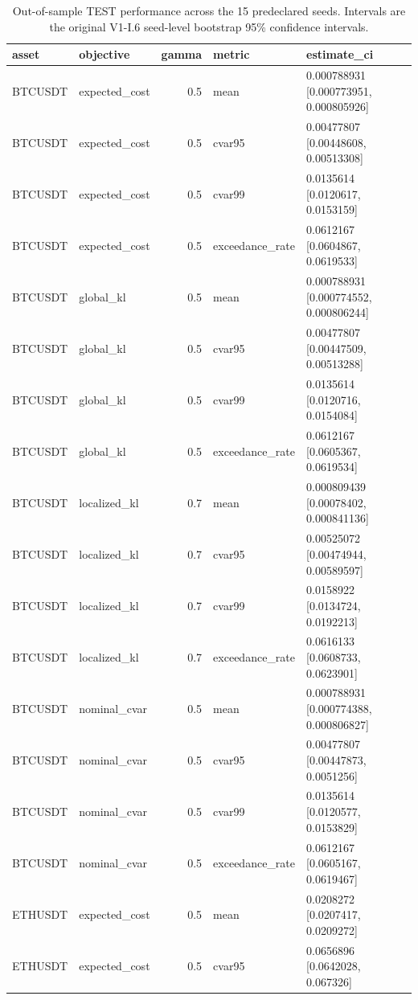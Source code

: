 \begin{table}[!htbp]
\centering
\caption{Out-of-sample TEST performance across the 15 predeclared seeds. Intervals are the original V1-I.6 seed-level bootstrap 95\% confidence intervals.}
\label{tab:i7_test_summary}
\small
\begin{tabular}{llrll}
\toprule
asset & objective & gamma & metric & estimate\_ci \\
\midrule
BTCUSDT & expected\_cost & 0.5 & mean & 0.000788931 [0.000773951, 0.000805926] \\
BTCUSDT & expected\_cost & 0.5 & cvar95 & 0.00477807 [0.00448608, 0.00513308] \\
BTCUSDT & expected\_cost & 0.5 & cvar99 & 0.0135614 [0.0120617, 0.0153159] \\
BTCUSDT & expected\_cost & 0.5 & exceedance\_rate & 0.0612167 [0.0604867, 0.0619533] \\
BTCUSDT & global\_kl & 0.5 & mean & 0.000788931 [0.000774552, 0.000806244] \\
BTCUSDT & global\_kl & 0.5 & cvar95 & 0.00477807 [0.00447509, 0.00513288] \\
BTCUSDT & global\_kl & 0.5 & cvar99 & 0.0135614 [0.0120716, 0.0154084] \\
BTCUSDT & global\_kl & 0.5 & exceedance\_rate & 0.0612167 [0.0605367, 0.0619534] \\
BTCUSDT & localized\_kl & 0.7 & mean & 0.000809439 [0.00078402, 0.000841136] \\
BTCUSDT & localized\_kl & 0.7 & cvar95 & 0.00525072 [0.00474944, 0.00589597] \\
BTCUSDT & localized\_kl & 0.7 & cvar99 & 0.0158922 [0.0134724, 0.0192213] \\
BTCUSDT & localized\_kl & 0.7 & exceedance\_rate & 0.0616133 [0.0608733, 0.0623901] \\
BTCUSDT & nominal\_cvar & 0.5 & mean & 0.000788931 [0.000774388, 0.000806827] \\
BTCUSDT & nominal\_cvar & 0.5 & cvar95 & 0.00477807 [0.00447873, 0.0051256] \\
BTCUSDT & nominal\_cvar & 0.5 & cvar99 & 0.0135614 [0.0120577, 0.0153829] \\
BTCUSDT & nominal\_cvar & 0.5 & exceedance\_rate & 0.0612167 [0.0605167, 0.0619467] \\
ETHUSDT & expected\_cost & 0.5 & mean & 0.0208272 [0.0207417, 0.0209272] \\
ETHUSDT & expected\_cost & 0.5 & cvar95 & 0.0656896 [0.0642028, 0.067326] \\

\end{tabular}
\end{table}
